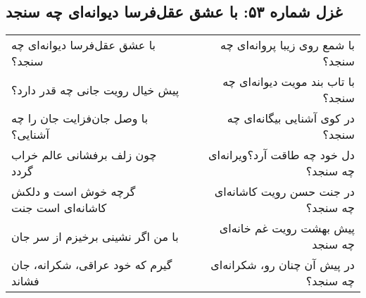 \begin{center}
\section*{غزل شماره ۵۳: با عشق عقل‌فرسا دیوانه‌ای چه سنجد}
\label{sec:053}
\begin{longtable}{l p{0.5cm} r}
با عشق عقل‌فرسا دیوانه‌ای چه سنجد؟
&&
با شمع روی زیبا پروانه‌ای چه سنجد؟
\\
پیش خیال رویت جانی چه قدر دارد؟
&&
با تاب بند مویت دیوانه‌ای چه سنجد؟
\\
با وصل جان‌فزایت جان را چه آشنایی؟
&&
در کوی آشنایی بیگانه‌ای چه سنجد؟
\\
چون زلف برفشانی عالم خراب گردد
&&
دل خود چه طاقت آرد؟ویرانه‌ای چه سنجد؟
\\
گرچه خوش است و دلکش کاشانه‌ای است جنت
&&
در جنت حسن رویت کاشانه‌ای چه سنجد؟
\\
با من اگر نشینی برخیزم از سر جان
&&
پیش بهشت رویت غم خانه‌ای چه سنجد
\\
گیرم که خود عراقی، شکرانه، جان فشاند
&&
در پیش آن چنان رو، شکرانه‌ای چه سنجد؟
\\
\end{longtable}
\end{center}
